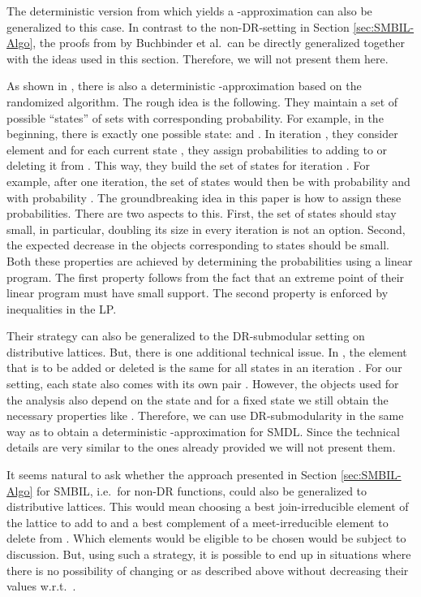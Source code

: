 \documentclass{article}
\theoremstyle{plain}
\theoremstyle{definition}
\begin{document}
The deterministic version from \cite{DoubleGreedy} which yields a -approximation can also be generalized to this case. 
In contrast to the non-DR-setting in Section \ref{sec:SMBIL-Algo}, the proofs from \cite{DoubleGreedy} by 
Buchbinder et al.\ can be directly generalized together with the ideas used in this section. Therefore, we will not present them here. 

As shown in \cite{DerandomizedDoubleGreedy}, there is also a deterministic -approximation based on the randomized algorithm. 
The rough idea is the following. They maintain a set of possible ``states'' of sets with corresponding probability. For example, 
in the beginning, there is exactly one possible state:  and .
In iteration , they consider element  and for each current state , they assign probabilities to adding  to  or deleting
it from . This way, they build the set of states for iteration . For example, after one iteration, 
the set of states would then be  with probability  and  with probability . 
The groundbreaking idea in this paper is how to assign these probabilities. There are two aspects to this. 
First, the set of states should stay small, in particular, doubling its size in every iteration is not an option. Second, the expected decrease in 
the objects  corresponding to states  should be small. 
Both these properties are achieved by determining the probabilities using a linear program. The first property follows from the fact 
that an extreme point of their linear program must have small support. The second property is enforced by inequalities in the LP. 

Their strategy can also be generalized to the DR-submodular setting on distributive lattices. But, there is one additional technical issue. 
In \cite{DerandomizedDoubleGreedy}, the element that is to be added or deleted is the same for all states in an iteration . 
For our setting, each state  also comes with its own pair . 
However, the objects  used for the analysis also depend on the state and for a fixed state we still obtain the necessary properties 
like .
Therefore, we can use DR-submodularity in the same way as \cite{DerandomizedDoubleGreedy} 
to obtain a deterministic -approximation for SMDL. Since the technical details are very similar to the ones already provided we will
not present them. 

It seems natural to ask whether the approach presented in Section \ref{sec:SMBIL-Algo} for SMBIL, i.e.\ for non-DR functions, 
could also be generalized to distributive lattices. 
This would mean choosing a best join-irreducible element of the lattice to add to  and a best complement of a meet-irreducible element to delete from . 
Which elements would be eligible to be chosen would be subject to discussion. 
But, using such a strategy, it is possible to end up in situations where there is no possibility of changing 
 or  as described above without decreasing their values w.r.t.\ . 
\end{document}

